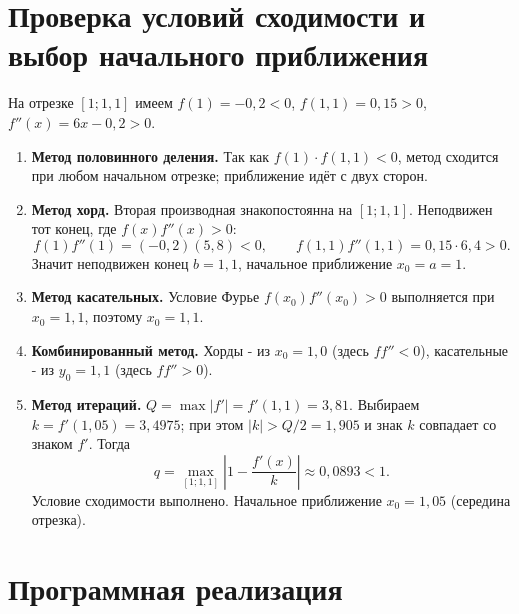 \documentclass[14pt,a4paper]{extarticle}
\begin{document}
\section{Проверка условий сходимости и выбор начального приближения}

На отрезке $[1;1{,}1]$ имеем $f(1) = -0{,}2 < 0$, $f(1{,}1)=0{,}15>0$,
$f''(x)=6x-0{,}2>0$.

\begin{enumerate}
    \item \textbf{Метод половинного деления.} Так как
          $f(1)\cdot f(1{,}1) < 0$, метод сходится при любом начальном
          отрезке; приближение идёт с двух сторон.

    \item \textbf{Метод хорд.} Вторая производная знакопостоянна на
          $[1;1{,}1]$. Неподвижен тот конец, где $f(x)f''(x)>0$:
          \[
              f(1)f''(1) = (-0{,}2)(5{,}8) < 0, \qquad
              f(1{,}1)f''(1{,}1) = 0{,}15\cdot 6{,}4 > 0 .
          \]
          Значит неподвижен конец $b=1{,}1$, начальное приближение
          $x_0 = a = 1$.

    \item \textbf{Метод касательных.} Условие Фурье
          $f(x_0)f''(x_0)>0$ выполняется при $x_0 = 1{,}1$, поэтому
          $x_0 = 1{,}1$.

    \item \textbf{Комбинированный метод.} Хорды - из $x_0=1{,}0$
          (здесь $f f''<0$), касательные - из $y_0=1{,}1$ (здесь
          $f f''>0$).

    \item \textbf{Метод итераций.} $Q=\max|f'| = f'(1{,}1) = 3{,}81$.
          Выбираем $k=f'(1{,}05)=3{,}4975$; при этом $|k|>Q/2=1{,}905$ и
          знак $k$ совпадает со знаком $f'$. Тогда
          \[
              q = \max_{[1;1{,}1]}\left|1-\frac{f'(x)}{k}\right| \approx 0{,}0893 < 1 .
          \]
          Условие сходимости выполнено. Начальное приближение
          $x_0 = 1{,}05$ (середина отрезка).
\end{enumerate}

\section{Программная реализация}
\end{document}
